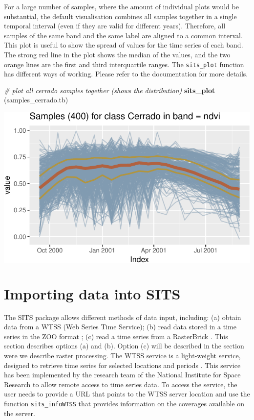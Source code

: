 \documentclass[11pt,]{article}
\newenvironment{Shaded}{\begin{snugshade}}{\end{snugshade}}
\newcommand{\KeywordTok}[1]{\textcolor[rgb]{0.13,0.29,0.53}{\textbf{#1}}}
\newcommand{\CommentTok}[1]{\textcolor[rgb]{0.56,0.35,0.01}{\textit{#1}}}
\newcommand{\NormalTok}[1]{#1}
\begin{document}
For a large number of samples, where the amount of individual plots
would be substantial, the default visualisation combines all samples
together in a single temporal interval (even if they are valid for
different years). Therefore, all samples of the same band and the same
label are aligned to a common interval. This plot is useful to show the
spread of values for the time series of each band. The strong red line
in the plot shows the median of the values, and the two orange lines are
the first and third interquartile ranges. The \texttt{sits\_plot}
function has different ways of working. Please refer to the
documentation for more details.

\begin{Shaded}
\begin{Highlighting}[]
\CommentTok{# plot all cerrado samples together (shows the distribution)}
\KeywordTok{sits_plot}\NormalTok{ (samples_cerrado.tb)}
\end{Highlighting}
\end{Shaded}

\begin{center}\includegraphics{sits_description_files/figure-latex/unnamed-chunk-11-1} \end{center}

\section{Importing data into SITS}\label{importing-data-into-sits}

The SITS package allows different methods of data input, including: (a)
obtain data from a WTSS (Web Series Time Service); (b) read data stored
in a time series in the ZOO format \citep{Zeileis2005}; (c) read a time
series from a RasterBrick \citep{Hijmans2015}. This section describes
options (a) and (b). Option (c) will be described in the section were we
describe raster processing. The WTSS service is a light-weight service,
designed to retrieve time series for selected locations and periods
\citep{Vinhas2016}. This service has been implemented by the research
team of the National Institute for Space Research to allow remote access
to time series data. To access the service, the user needs to provide a
URL that points to the WTSS server location and use the function
\texttt{sits\_infoWTSS} that provides information on the coverages
available on the server.
\end{document}
